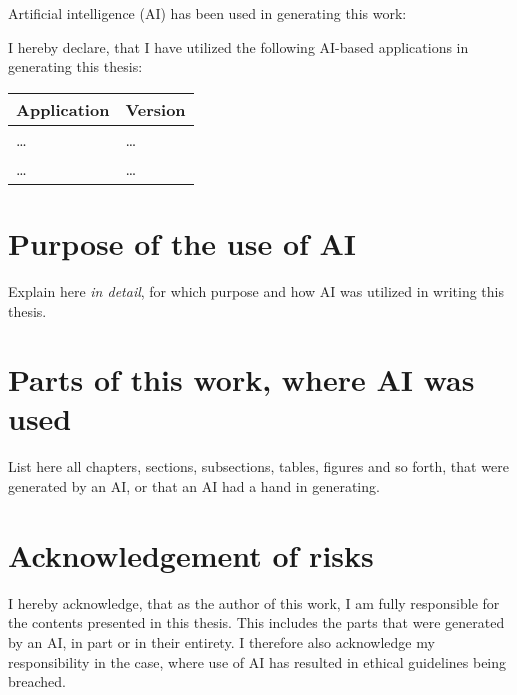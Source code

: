 Artificial intelligence (AI) has been used in generating this work:

\yestoai %

I hereby declare, that I have utilized the following AI-based applications in generating this thesis:

\begin{center}
    \begin{tabularx}{\linewidth}{X|l}
        \toprule
        \textbf{Application} & \textbf{Version} \\
        \midrule
        \dots & \dots \\
        \dots & \dots \\
        \bottomrule
    \end{tabularx}
\end{center}

\section*{Purpose of the use of AI}

Explain here \emph{in detail}, for which purpose and how AI was utilized in writing this thesis.

\section*{Parts of this work,  where AI was used}

List here all chapters, sections, subsections, tables, figures and so forth,
that were generated by an AI, or that an AI had a hand in generating.

\section*{Acknowledgement of risks}

I hereby acknowledge, that as the author of this work, I am fully responsible
for the contents presented in this thesis. This includes the parts that were
generated by an AI, in part or in their entirety. I therefore also acknowledge
my responsibility in the case, where use of AI has resulted in ethical
guidelines being breached.
